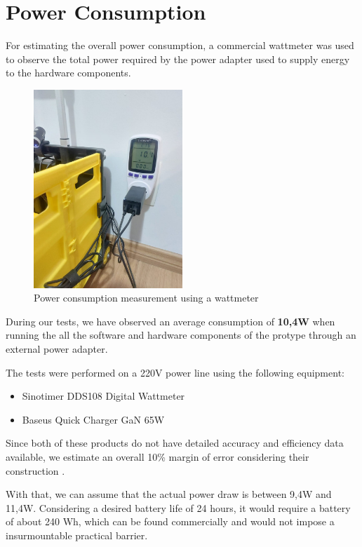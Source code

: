 \documentclass[openright]{normas-utf-tex} %
\begin{document}
\section{Power Consumption}

For estimating the overall power consumption, a commercial wattmeter was used
to observe the total power required by the power adapter used to supply energy
to the hardware components.

\begin{figure}[H]
	\centering
	\includegraphics[width=0.5\textwidth]{./images/powerconsumption.jpeg}
	\caption[Power consumption measurement using a wattmeter]{Power consumption measurement using a wattmeter}
\end{figure}

During our tests, we have observed an average consumption of \textbf{10,4W}
when running the all the software and hardware components of the protype
through an external power adapter. 

The tests were performed on a 220V power line using the following equipment:
\begin{itemize}
    \item Sinotimer DDS108 Digital Wattmeter
    \item Baseus Quick Charger GaN 65W
\end{itemize}

Since both of these products do not have detailed accuracy and efficiency data
available, we estimate an overall 10\% margin of error considering their
construction \cite{Chen2017}. 

With that, we can assume that the actual power draw is between 9,4W and 11,4W.
Considering a desired  battery life of 24 hours, it would require a battery of
about 240 Wh, which can be found commercially and would not impose a
insurmountable practical barrier.
\end{document}
